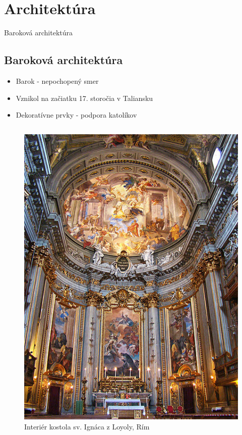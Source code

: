 \documentclass[dvipsnames]{beamer}
\begin{document}
\section{Architektúra}
\frame{\sectionpage}
\begin{frame}{Baroková architektúra}
	\subsection{Baroková architektúra}
	\begin{itemize}
		\item Barok - nepochopený smer
		\item Vznikol na začiatku 17. storočia v Taliansku
		\item Dekoratívne prvky - podpora katolíkov
	\end{itemize}
		\begin{columns}
		\begin{figure}
			\includegraphics[scale=0.35]{loyola}
			\caption{Interiér kostola sv. Ignáca z Loyoly, Rím}
		\end{figure}
		\end{columns}
\end{frame}
\end{document}
